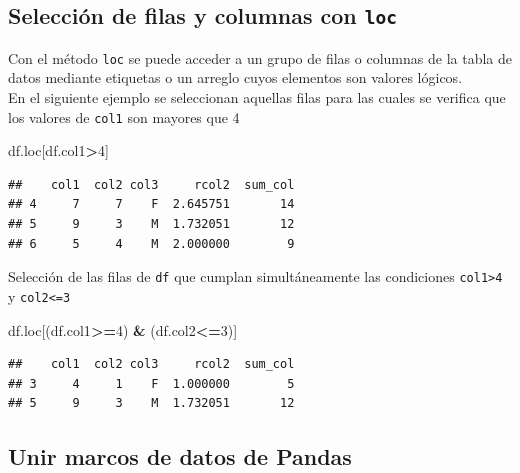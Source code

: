 \documentclass[
]{book}
\newenvironment{Shaded}{\begin{snugshade}}{\end{snugshade}}
\newcommand{\DecValTok}[1]{\textcolor[rgb]{0.00,0.00,0.81}{#1}}
\newcommand{\NormalTok}[1]{#1}
\newcommand{\OperatorTok}[1]{\textcolor[rgb]{0.81,0.36,0.00}{\textbf{#1}}}
\theoremstyle{definition}
\theoremstyle{definition}
\theoremstyle{definition}
\theoremstyle{definition}
\theoremstyle{remark}
\begin{document}
\hypertarget{selecciuxf3n-de-filas-y-columnas-con-loc}{%
\subsection{\texorpdfstring{Selección de filas y columnas con \texttt{loc}}{Selección de filas y columnas con loc}}\label{selecciuxf3n-de-filas-y-columnas-con-loc}}

Con el método \texttt{loc} se puede acceder a un grupo de filas o columnas de la tabla de datos mediante etiquetas o un arreglo cuyos elementos son valores lógicos.\\
En el siguiente ejemplo se seleccionan aquellas filas para las cuales se verifica que los valores de \texttt{col1} son mayores que 4

\begin{Shaded}
\begin{Highlighting}[]
\NormalTok{df.loc[df.col1}\OperatorTok{\textgreater{}}\DecValTok{4}\NormalTok{] }
\end{Highlighting}
\end{Shaded}

\begin{verbatim}
##    col1  col2 col3     rcol2  sum_col
## 4     7     7    F  2.645751       14
## 5     9     3    M  1.732051       12
## 6     5     4    M  2.000000        9
\end{verbatim}

Selección de las filas de \texttt{df} que cumplan simultáneamente las condiciones \texttt{col1\textgreater{}4} y \texttt{col2\textless{}=3}

\begin{Shaded}
\begin{Highlighting}[]
\NormalTok{df.loc[(df.col1}\OperatorTok{\textgreater{}=}\DecValTok{4}\NormalTok{) }\OperatorTok{\&}\NormalTok{ (df.col2}\OperatorTok{\textless{}=}\DecValTok{3}\NormalTok{)]  }
\end{Highlighting}
\end{Shaded}

\begin{verbatim}
##    col1  col2 col3     rcol2  sum_col
## 3     4     1    F  1.000000        5
## 5     9     3    M  1.732051       12
\end{verbatim}

\hypertarget{unir-marcos-de-datos-de-pandas}{%
\subsection{Unir marcos de datos de Pandas}\label{unir-marcos-de-datos-de-pandas}}
\end{document}
